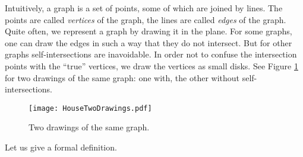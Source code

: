 

\setcounter{section}{1}
\setcounter{subsection}{1}
\setcounter{dfn}{0}

Intuitively, a graph is a set of points, some of which are joined by lines.
The points are called \emph{vertices} of the graph, the lines are called \emph{edges} of the graph.
Quite often, we represent a graph by drawing it in the plane.
For some graphs, one can draw the edges in such a way that they do not intersect.
But for other graphs self-intersections are inavoidable.
In order not to confuse the intersection points with the ``true'' vertices, we draw the vertices as small disks.
See Figure \ref{fig:TwoDrawings} for two drawings of the same graph: one with, the other without self-intersections.

\begin{figure}[ht]
\begin{center}
\texttt{[image: HouseTwoDrawings.pdf]}
\end{center}
\caption{Two drawings of the same graph.}
\label{fig:TwoDrawings}
\end{figure}

Let us give a formal definition.


